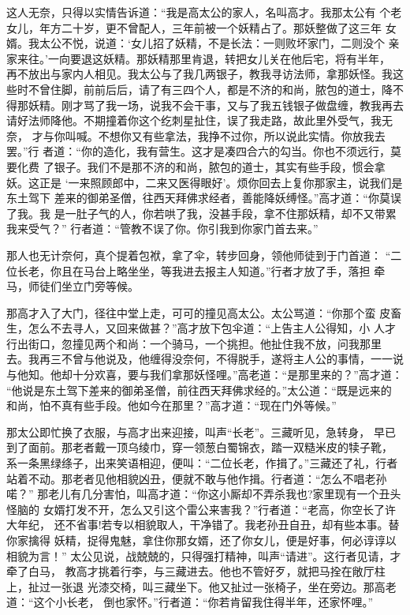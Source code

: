 这人无奈，只得以实情告诉道：“我是高太公的家人，名叫高才。我那太公有
个老女儿，年方二十岁，更不曾配人，三年前被一个妖精占了。那妖整做了这三年
女婿。我太公不悦，说道：‘女儿招了妖精，不是长法：一则败坏家门，二则没个
亲家来往。’一向要退这妖精。那妖精那里肯退，转把女儿关在他后宅，将有半年，
再不放出与家内人相见。我太公与了我几两银子，教我寻访法师，拿那妖怪。我这
些时不曾住脚，前前后后，请了有三四个人，都是不济的和尚，脓包的道士，降不
得那妖精。刚才骂了我一场，说我不会干事，又与了我五钱银子做盘缠，教我再去
请好法师降他。不期撞着你这个纥刺星扯住，误了我走路，故此里外受气，我无奈，
才与你叫喊。不想你又有些拿法，我挣不过你，所以说此实情。你放我去罢。”行
者道：“你的造化，我有营生。这才是凑四合六的勾当。你也不须远行，莫要化费
了银子。我们不是那不济的和尚，脓包的道士，其实有些手段，惯会拿妖。这正是
‘一来照顾郎中，二来又医得眼好’。烦你回去上复你那家主，说我们是东土驾下
差来的御弟圣僧，往西天拜佛求经者，善能降妖缚怪。”高才道：“你莫误了我。我
是一肚子气的人，你若哄了我，没甚手段，拿不住那妖精，却不又带累我来受气？”
行者道：“管教不误了你。你引我到你家门首去来。”

那人也无计奈何，真个提着包袱，拿了伞，转步回身，领他师徒到于门首道：
“二位长老，你且在马台上略坐坐，等我进去报主人知道。”行者才放了手，落担
牵马，师徒们坐立门旁等候。

那高才入了大门，径往中堂上走，可可的撞见高太公。太公骂道：“你那个蛮
皮畜生，怎么不去寻人，又回来做甚？”高才放下包伞道：“上告主人公得知，小
人才行出街口，忽撞见两个和尚：一个骑马，一个挑担。他扯住我不放，问我那里
去。我再三不曾与他说及，他缠得没奈何，不得脱手，遂将主人公的事情，一一说
与他知。他却十分欢喜，要与我们拿那妖怪哩。”高老道：“是那里来的？”高才道：
“他说是东土驾下差来的御弟圣僧，前往西天拜佛求经的。”太公道：“既是远来的
和尚，怕不真有些手段。他如今在那里？”高才道：“现在门外等候。”

那太公即忙换了衣服，与高才出来迎接，叫声“长老”。三藏听见，急转身，
早已到了面前。那老者戴一顶乌绫巾，穿一领葱白蜀锦衣，踏一双糙米皮的犊子靴，
系一条黑绿绦子，出来笑语相迎，便叫：“二位长老，作揖了。”三藏还了礼，行者
站着不动。那老者见他相貌凶丑，便就不敢与他作揖。行者道：“怎么不唱老孙喏？”
那老儿有几分害怕，叫高才道：“你这小厮却不弄杀我也?家里现有一个丑头怪脑的
女婿打发不开，怎么又引这个雷公来害我？”行者道：“老高，你空长了许大年纪，
还不省事!若专以相貌取人，干净错了。我老孙丑自丑，却有些本事。替你家擒得
妖精，捉得鬼魅，拿住你那女婿，还了你女儿，便是好事，何必谆谆以相貌为言！”
太公见说，战兢兢的，只得强打精神，叫声“请进”。这行者见请，才牵了白马，
教高才挑着行李，与三藏进去。他也不管好歹，就把马拴在敞厅柱上，扯过一张退
光漆交椅，叫三藏坐下。他又扯过一张椅子，坐在旁边。那高老道：“这个小长老，
倒也家怀。”行者道：“你若肯留我住得半年，还家怀哩。”

